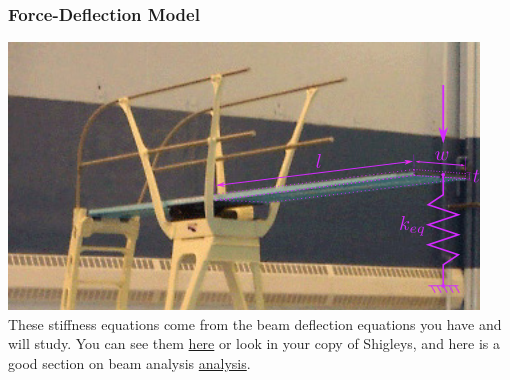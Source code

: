 \documentclass[fleqn]{beamer} %
\newcommand{\sectionIsubsectionIItitle}{Force-Deflection Model}
\begin{document}
			\begin{frame}
				\frametitle{\sectionIsubsectionIItitle}\small
				\bigskip

				\begin{multicols}{2}
					\includegraphics[scale=.4]{images/diving_board_cut.png}
					\small
					These stiffness equations come from the beam deflection equations you have and will study.\vspc 
					You can see them \href{https://mechanicalc.com/reference/beam-deflection-tables}{{\BL here}} or look in your copy of Shigleys, and here is a good section on beam analysis \href{https://mechanicalc.com/reference/beam-analysis}{\BL analysis}.



\end{multicols}
\end{frame}
\end{document}
